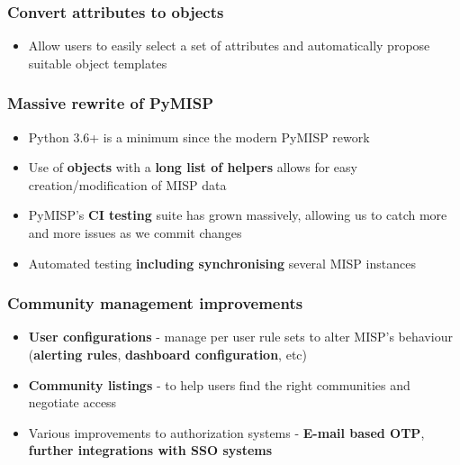 \begin{frame}
\frametitle{Convert attributes to objects}
\begin{itemize}
    \item Allow users to easily select a set of attributes and automatically propose suitable object templates
\end{itemize}
\begin{center}
\end{center}
\end{frame}

\begin{frame}
\frametitle{Massive rewrite of PyMISP}
\begin{itemize}
	\item Python 3.6+ is a minimum since the modern PyMISP rework
        \item Use of {\bf objects} with a {\bf long list of helpers} allows for easy creation/modification of MISP data
        \item PyMISP's {\bf CI testing} suite has grown massively, allowing us to catch more and more issues as we commit changes
        \item Automated testing {\bf including synchronising} several MISP instances
\end{itemize}
\end{frame}

\begin{frame}
\frametitle{Community management improvements}
\begin{itemize}
	\item {\bf User configurations} - manage per user rule sets to alter MISP's behaviour ({\bf alerting rules}, {\bf dashboard configuration}, etc)
        \item {\bf Community listings} - to help users find the right communities and negotiate access
        \item Various improvements to authorization systems - {\bf E-mail based OTP}, {\bf further integrations with SSO systems}
\end{itemize}
\end{frame}

